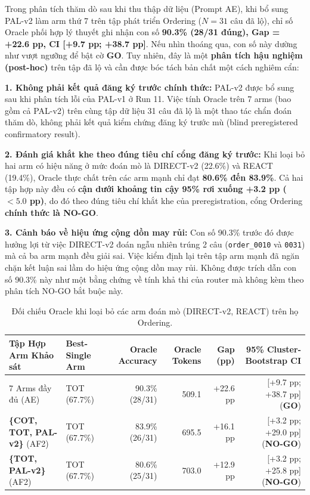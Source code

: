 \documentclass[11pt,a4paper]{report}
\begin{document}
Trong phân tích thăm dò sau khi thu thập dữ liệu (Prompt AE), khi bổ sung PAL-v2 làm arm thứ 7 trên tập phát triển Ordering ($N=31$ câu đã lộ), chỉ số Oracle phối hợp lý thuyết ghi nhận con số \textbf{90.3\% (28/31 đúng), Gap = +22.6 pp, CI [+9.7 pp; +38.7 pp]}. Nếu nhìn thoáng qua, con số này dường như vượt ngưỡng để bật cờ \textbf{GO}. Tuy nhiên, đây là một \textbf{phân tích hậu nghiệm (post-hoc)} trên tập đã lộ và cần được bóc tách bản chất một cách nghiêm cẩn:

\begin{tcolorbox}[title=Bản chất Khoa học: Phán quyết Thực tế là NO-GO]
\textbf{1. Không phải kết quả đăng ký trước chính thức:} PAL-v2 được bổ sung sau khi phân tích lỗi của PAL-v1 ở Run 11. Việc tính Oracle trên 7 arms (bao gồm cả PAL-v2) trên cùng tập dữ liệu 31 câu đã lộ là một thao tác chẩn đoán thăm dò, không phải kết quả kiểm chứng đăng ký trước mù (blind preregistered confirmatory result).

\textbf{2. Đánh giá khắt khe theo đúng tiêu chí cổng đăng ký trước:} Khi loại bỏ hai arm có hiệu năng ở mức đoán mò là DIRECT-v2 (22.6\%) và REACT (19.4\%), Oracle thực chất trên các arm mạnh chỉ đạt \textbf{80.6\% đến 83.9\%}. Cả hai tập hợp này đều có \textbf{cận dưới khoảng tin cậy 95\% rơi xuống +3.2 pp ($< 5.0$ pp)}, do đó theo đúng tiêu chí khắt khe của preregistration, cổng Ordering \textbf{chính thức là NO-GO}.

\textbf{3. Cảnh báo về hiệu ứng cộng dồn may rủi:} Con số 90.3\% trước đó được hưởng lợi từ việc DIRECT-v2 đoán ngẫu nhiên trúng 2 câu (\texttt{order\_0010} và \texttt{0031}) mà cả ba arm mạnh đều giải sai. Việc kiểm định lại trên tập arm mạnh đã ngăn chặn kết luận sai lầm do hiệu ứng cộng dồn may rủi. Không được trích dẫn con số 90.3\% này như một bằng chứng về tính khả thi của router mà không kèm theo phân tích NO-GO bắt buộc này.
\end{tcolorbox}

\begin{table}[h!]
\centering\small
\begin{tabularx}{\textwidth}{llrrrr}
\toprule
\textbf{Tập Hợp Arm Khảo sát} & \textbf{Best-Single Arm} & \textbf{Oracle Accuracy} & \textbf{Oracle Tokens} & \textbf{Gap (pp)} & \textbf{95\% Cluster-Bootstrap CI} \\
\midrule
7 Arms đầy đủ (AE) & TOT (67.7\%) & 90.3\% (28/31) & 509.1 & +22.6 pp & [+9.7 pp; +38.7 pp] (\textbf{GO}) \\
\textbf{\{COT, TOT, PAL-v2\}} (AF2) & TOT (67.7\%) & 83.9\% (26/31) & 695.5 & +16.1 pp & [+3.2 pp; +29.0 pp] (\textbf{NO-GO}) \\
\textbf{\{TOT, PAL-v2\}} (AF2) & TOT (67.7\%) & 80.6\% (25/31) & 703.0 & +12.9 pp & [+3.2 pp; +25.8 pp] (\textbf{NO-GO}) \\
\bottomrule
\end{tabularx}
\caption{Đối chiếu Oracle khi loại bỏ các arm đoán mò (DIRECT-v2, REACT) trên họ Ordering.}\label{tab:oracle_comparison}
\end{table}
\end{document}

